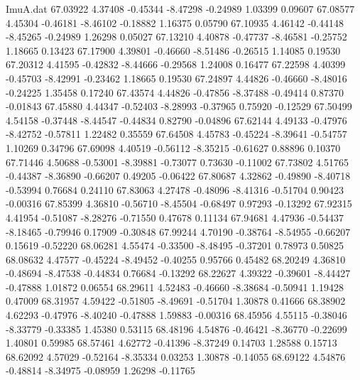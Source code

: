 \begin{filecontents}{ImuA.dat}
  67.03922    4.37408   -0.45344   -8.47298   -0.24989    1.03399    0.09607
  67.08577    4.45304   -0.46181   -8.46102   -0.18882    1.16375    0.05790
  67.10935    4.46142   -0.44148   -8.45265   -0.24989    1.26298    0.05027
  67.13210    4.40878   -0.47737   -8.46581   -0.25752    1.18665    0.13423
  67.17900    4.39801   -0.46660   -8.51486   -0.26515    1.14085    0.19530
  67.20312    4.41595   -0.42832   -8.44666   -0.29568    1.24008    0.16477
  67.22598    4.40399   -0.45703   -8.42991   -0.23462    1.18665    0.19530
  67.24897    4.44826   -0.46660   -8.48016   -0.24225    1.35458    0.17240
  67.43574    4.44826   -0.47856   -8.37488   -0.49414    0.87370   -0.01843
  67.45880    4.44347   -0.52403   -8.28993   -0.37965    0.75920   -0.12529
  67.50499    4.54158   -0.37448   -8.44547   -0.44834    0.82790   -0.04896
  67.62144    4.49133   -0.47976   -8.42752   -0.57811    1.22482    0.35559
  67.64508    4.45783   -0.45224   -8.39641   -0.54757    1.10269    0.34796
  67.69098    4.40519   -0.56112   -8.35215   -0.61627    0.88896    0.10370
  67.71446    4.50688   -0.53001   -8.39881   -0.73077    0.73630   -0.11002
  67.73802    4.51765   -0.44387   -8.36890   -0.66207    0.49205   -0.06422
  67.80687    4.32862   -0.49890   -8.40718   -0.53994    0.76684    0.24110
  67.83063    4.27478   -0.48096   -8.41316   -0.51704    0.90423   -0.00316
  67.85399    4.36810   -0.56710   -8.45504   -0.68497    0.97293   -0.13292
  67.92315    4.41954   -0.51087   -8.28276   -0.71550    0.47678    0.11134
  67.94681    4.47936   -0.54437   -8.18465   -0.79946    0.17909   -0.30848
  67.99244    4.70190   -0.38764   -8.54955   -0.66207    0.15619   -0.52220
  68.06281    4.55474   -0.33500   -8.48495   -0.37201    0.78973    0.50825
  68.08632    4.47577   -0.45224   -8.49452   -0.40255    0.95766    0.45482
  68.20249    4.36810   -0.48694   -8.47538   -0.44834    0.76684   -0.13292
  68.22627    4.39322   -0.39601   -8.44427   -0.47888    1.01872    0.06554
  68.29611    4.52483   -0.46660   -8.38684   -0.50941    1.19428    0.47009
  68.31957    4.59422   -0.51805   -8.49691   -0.51704    1.30878    0.41666
  68.38902    4.62293   -0.47976   -8.40240   -0.47888    1.59883   -0.00316
  68.45956    4.55115   -0.38046   -8.33779   -0.33385    1.45380    0.53115
  68.48196    4.54876   -0.46421   -8.36770   -0.22699    1.40801    0.59985
  68.57461    4.62772   -0.41396   -8.37249    0.14703    1.28588    0.15713
  68.62092    4.57029   -0.52164   -8.35334    0.03253    1.30878   -0.14055
  68.69122    4.54876   -0.48814   -8.34975   -0.08959    1.26298   -0.11765

\end{filecontents}
